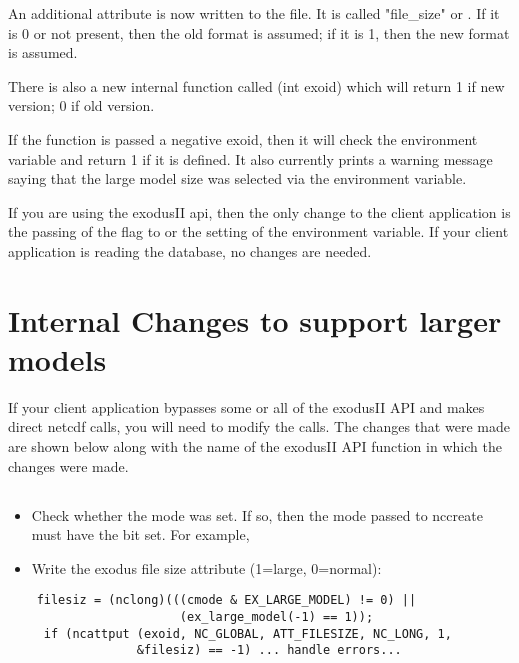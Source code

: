 An additional attribute is now written to the file. It is called
"file_size" or . If it is 0 or not present, then
the old format is assumed; if it is 1, then the new format is assumed.

There is also a new internal function called
(int exoid) which will return 1 if new
version; 0 if old version.

If the function is passed a negative exoid, then it will check the
 environment
variable and return 1 if it is defined. It also currently prints a
warning message saying that the large model size was selected via the
environment variable.

If you are using the exodusII api, then the only change to the client
application is the passing of the  flag to
 or the setting of the
 environment
variable. If your client application is reading the database, no
changes are needed.

\section{Internal Changes to support larger models}
If your client application bypasses some or all of the exodusII API
and makes direct netcdf calls, you will need to modify the calls. The
changes that were made are shown below along with the name of the
exodusII API function in which the changes were made.

\subsection{}
\begin{itemize}
\item Check whether the  mode was set. If so, then the
mode passed to nccreate must have the  bit set. For
example, 

\item Write the exodus file size
 attribute (1=large, 0=normal):
\end{itemize}
\begin{lstlisting}
    filesiz = (nclong)(((cmode & EX_LARGE_MODEL) != 0) ||
                        (ex_large_model(-1) == 1));
     if (ncattput (exoid, NC_GLOBAL, ATT_FILESIZE, NC_LONG, 1,
                  &filesiz) == -1) ... handle errors...
\end{lstlisting}

